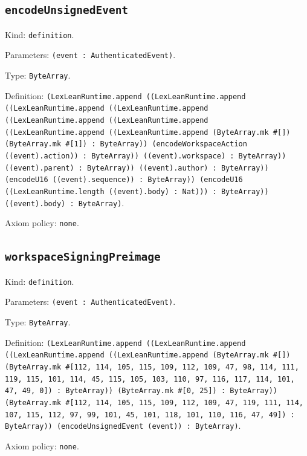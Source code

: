 \documentclass[11pt]{article}
\begin{document}
\subsection*{\texttt{encodeUnsignedEvent}}
\noindent Kind: \texttt{definition}.\par
\noindent Parameters: \texttt{(event : AuthenticatedEvent)}.\par
\noindent Type: \texttt{ByteArray}.\par
\noindent Definition: \texttt{(LexLeanRuntime.append ((LexLeanRuntime.append ((LexLeanRuntime.append ((LexLeanRuntime.append ((LexLeanRuntime.append ((LexLeanRuntime.append ((LexLeanRuntime.append ((LexLeanRuntime.append (ByteArray.mk \#[]) (ByteArray.mk \#[1]) : ByteArray)) (encodeWorkspaceAction ((event).action)) : ByteArray)) ((event).workspace) : ByteArray)) ((event).parent) : ByteArray)) ((event).author) : ByteArray)) (encodeU16 ((event).sequence)) : ByteArray)) (encodeU16 ((LexLeanRuntime.length ((event).body) : Nat))) : ByteArray)) ((event).body) : ByteArray)}.\par
\noindent Axiom policy: \texttt{none}.\par
\subsection*{\texttt{workspaceSigningPreimage}}
\noindent Kind: \texttt{definition}.\par
\noindent Parameters: \texttt{(event : AuthenticatedEvent)}.\par
\noindent Type: \texttt{ByteArray}.\par
\noindent Definition: \texttt{(LexLeanRuntime.append ((LexLeanRuntime.append ((LexLeanRuntime.append ((LexLeanRuntime.append (ByteArray.mk \#[]) (ByteArray.mk \#[112, 114, 105, 115, 109, 112, 109, 47, 98, 114, 111, 119, 115, 101, 114, 45, 115, 105, 103, 110, 97, 116, 117, 114, 101, 47, 49, 0]) : ByteArray)) (ByteArray.mk \#[0, 25]) : ByteArray)) (ByteArray.mk \#[112, 114, 105, 115, 109, 112, 109, 47, 119, 111, 114, 107, 115, 112, 97, 99, 101, 45, 101, 118, 101, 110, 116, 47, 49]) : ByteArray)) (encodeUnsignedEvent (event)) : ByteArray)}.\par
\noindent Axiom policy: \texttt{none}.\par
\end{document}
